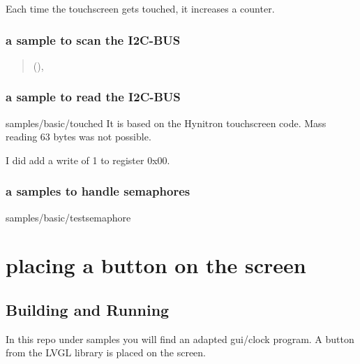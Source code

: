\documentclass[letterpaper,10pt,english]{sphinxmanual}
\begin{document}
Each time the touchscreen gets touched, it increases a counter.


\subsubsection{a sample to scan the I2C-BUS}
\label{\detokenize{behind/troubleshoot:a-sample-to-scan-the-i2c-bus}}\begin{quote}

({\hyperref[\detokenize{hacking/i2cscanning:i2cscanning}]{}}),
\end{quote}


\subsubsection{a sample to read the I2C-BUS}
\label{\detokenize{behind/troubleshoot:a-sample-to-read-the-i2c-bus}}
samples/basic/touched
It is based on the Hynitron touchscreen code.
Mass reading 63 bytes was not possible.

I did add a write of 1 to register 0x00.


\subsubsection{a samples to handle semaphores}
\label{\detokenize{behind/troubleshoot:a-samples-to-handle-semaphores}}
samples/basic/testsemaphore


\section{placing a button on the screen}
\label{\detokenize{behind/lvglbutton:placing-a-button-on-the-screen}}\label{\detokenize{behind/lvglbutton::doc}}
\begin{sphinxVerbatim}[commandchars=\\\{\}]
                             
\end{sphinxVerbatim}


\subsection{Building and Running}
\label{\detokenize{behind/lvglbutton:building-and-running}}
In this repo under samples you will find an adapted gui/clock program.
A button from the LVGL library is placed on the screen.
\end{document}
